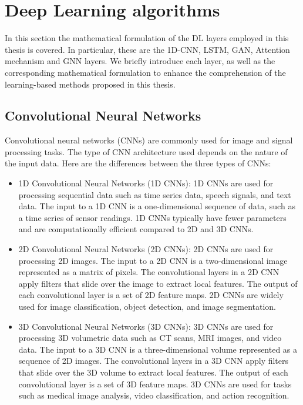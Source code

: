 \section{Deep Learning algorithms}
\label{sec:3_dlb_formulation}

In this section the mathematical formulation of the \ac{DL} layers employed in this thesis is covered. In particular, these are the 1D-\ac{CNN}, \ac{LSTM}, \ac{GAN}, Attention mechanism and \ac{GNN} layers. We briefly introduce each layer, as well as the corresponding mathematical formulation to enhance the comprehension of the learning-based methods proposed in this thesis.

\subsection{Convolutional Neural Networks}
\label{subsec:3_cnns}



Convolutional neural networks (CNNs) are commonly used for image and signal processing tasks. The type of CNN architecture used depends on the nature of the input data. Here are the differences between the three types of CNNs:

\begin{itemize}
	\item 1D Convolutional Neural Networks (1D CNNs): 1D CNNs are used for processing sequential data such as time series data, speech signals, and text data. The input to a 1D CNN is a one-dimensional sequence of data, such as a time series of sensor readings. 1D CNNs typically have fewer parameters and are computationally efficient compared to 2D and 3D CNNs.
	
	\item 2D Convolutional Neural Networks (2D CNNs): 2D CNNs are used for processing 2D images. The input to a 2D CNN is a two-dimensional image represented as a matrix of pixels. The convolutional layers in a 2D CNN apply filters that slide over the image to extract local features. The output of each convolutional layer is a set of 2D feature maps. 2D CNNs are widely used for image classification, object detection, and image segmentation.
	
	\item 3D Convolutional Neural Networks (3D CNNs): 3D CNNs are used for processing 3D volumetric data such as CT scans, MRI images, and video data. The input to a 3D CNN is a three-dimensional volume represented as a sequence of 2D images. The convolutional layers in a 3D CNN apply filters that slide over the 3D volume to extract local features. The output of each convolutional layer is a set of 3D feature maps. 3D CNNs are used for tasks such as medical image analysis, video classification, and action recognition.
\end{itemize}

